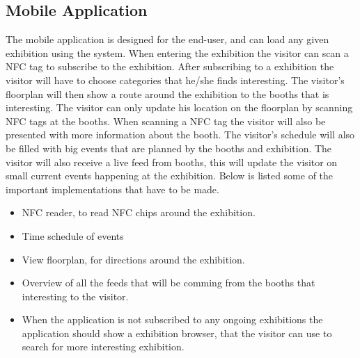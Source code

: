 \subsection*{Mobile Application}
The mobile application is designed for the end-user, and can load any given exhibition using the system. When entering the exhibition the visitor can scan a NFC tag to subscribe to the exhibition. After subscribing to a exhibition the visitor will have to choose categories that he/she finds interesting. The visitor's floorplan will then show a route around the exhibition to the booths that is interesting. The visitor can only update his location on the floorplan by scanning NFC tags at the booths. When scanning a NFC tag the visitor will also be presented with more information about the booth. The visitor's schedule will also be filled with big events that are planned by the booths and exhibition. The visitor will also receive a live feed from booths, this will update the visitor on small current events happening at the exhibition. Below is listed some of the important implementations that have to be made.
\begin{itemize}
\item NFC reader, to read NFC chips around the exhibition.
\item Time schedule of events
\item View floorplan, for directions around the exhibition.
\item Overview of all the feeds that will be comming from the booths that interesting to the visitor.
\item When the application is not subscribed to any ongoing exhibitions the application should show a exhibition browser, that the visitor can use to search for more interesting exhibition.
\end{itemize}